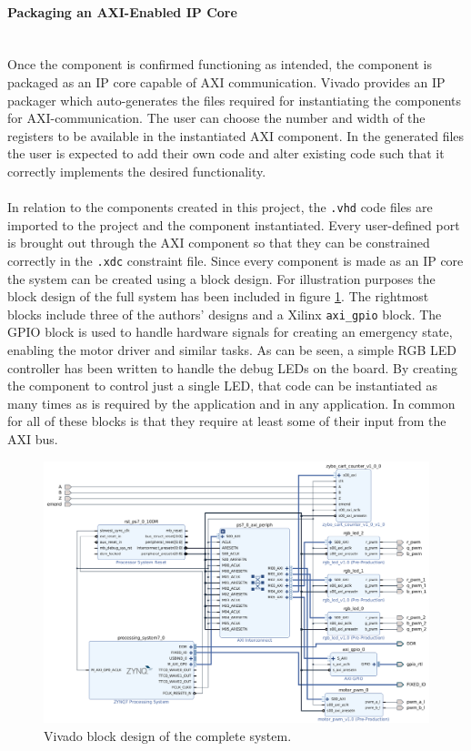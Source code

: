 \paragraph{Packaging an AXI-Enabled IP Core}~\\ %
\label{par:ip_cores}
Once the component is confirmed functioning as intended, the component is packaged as an IP core capable of AXI communication.
Vivado provides an IP packager which auto-generates the files required for instantiating the components for AXI-communication.
The user can choose the number and width of the registers to be available in the instantiated AXI component.
In the generated files the user is expected to add their own code and alter existing code such that it correctly implements the desired functionality.
\\~\\
In relation to the components created in this project, the \texttt{.vhd} code files are imported to the project and the component instantiated.
Every user-defined port is brought out through the AXI component so that they can be constrained correctly in the \texttt{.xdc} constraint file.
Since every component is made as an IP core the system can be created using a block design.
For illustration purposes the block design of the full system has been included in figure \ref{fig:blockdesign}.
The rightmost blocks include three of the authors' designs and a Xilinx \texttt{axi\_gpio} block.
The GPIO block is used to handle hardware signals for creating an emergency state, enabling the motor driver and similar tasks.
As can be seen, a simple RGB LED controller has been written to handle the debug LEDs on the board.
By creating the component to control just a single LED, that code can be instantiated as many times as is required by the application and in any application.
In common for all of these blocks is that they require at least some of their input from the AXI bus.

\begin{figure}[h]
	\centering
	\includegraphics[width=\linewidth]{graphics/block_design}
	\caption{Vivado block design of the complete system.}
	\label{fig:blockdesign}
\end{figure}

